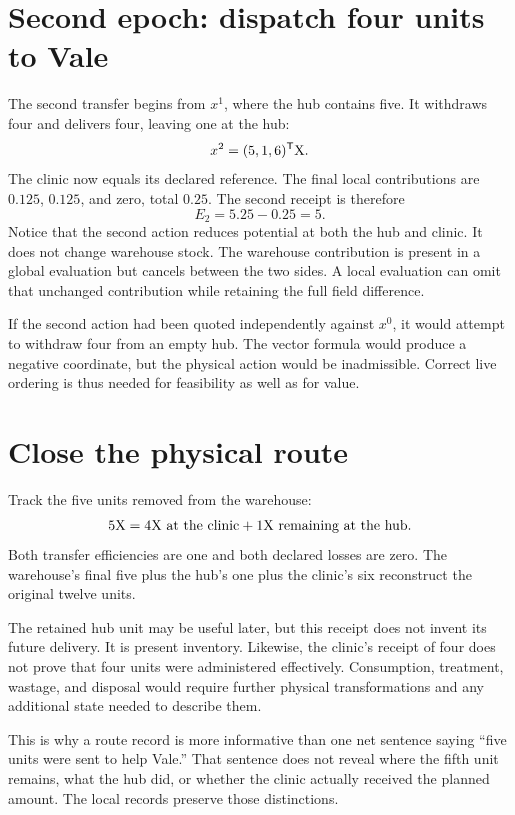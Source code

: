 \section{Second epoch: dispatch four units to Vale}

The second transfer begins from \(x^1\), where the hub contains five. It withdraws four and delivers four, leaving one at the hub:
\begin{equation}
x^2=(5,1,6)^{\mathsf T}\mathrm{X}.
\end{equation}
The clinic now equals its declared reference. The final local contributions are \(0.125\), \(0.125\), and zero, total \(0.25\). The second receipt is therefore
\begin{equation}
E_2=5.25-0.25=5.
\end{equation}
Notice that the second action reduces potential at both the hub and clinic. It does not change warehouse stock. The warehouse contribution is present in a global evaluation but cancels between the two sides. A local evaluation can omit that unchanged contribution while retaining the full field difference.

If the second action had been quoted independently against \(x^0\), it would attempt to withdraw four from an empty hub. The vector formula would produce a negative coordinate, but the physical action would be inadmissible. Correct live ordering is thus needed for feasibility as well as for value.

\section{Close the physical route}

Track the five units removed from the warehouse:
\begin{equation}
5\X=4\X\ \hbox{at the clinic}+1\X\ \hbox{remaining at the hub}.
\end{equation}
Both transfer efficiencies are one and both declared losses are zero. The warehouse's final five plus the hub's one plus the clinic's six reconstruct the original twelve units.

The retained hub unit may be useful later, but this receipt does not invent its future delivery. It is present inventory. Likewise, the clinic's receipt of four does not prove that four units were administered effectively. Consumption, treatment, wastage, and disposal would require further physical transformations and any additional state needed to describe them.

This is why a route record is more informative than one net sentence saying ``five units were sent to help Vale.'' That sentence does not reveal where the fifth unit remains, what the hub did, or whether the clinic actually received the planned amount. The local records preserve those distinctions.

